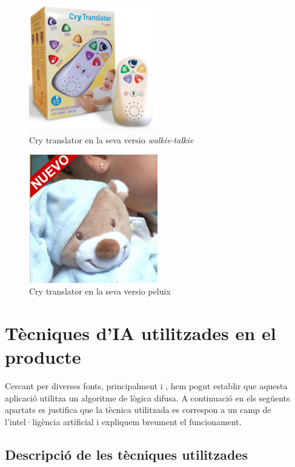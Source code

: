 \documentclass[11pt,a4paper]{article}
\begin{document}
\begin{figure}[hb]
\centering
\includegraphics[width=0.5\textwidth]{./fig/walkie.png}
\caption{Cry translator en la seva versio \emph{walkie-talkie}}
\label{fig:walkie}
\end{figure}

\begin{figure}[ht]
\centering
\includegraphics[width=0.5\textwidth]{./fig/peluix.png}
\caption{Cry translator en la seva versio peluix}
\label{fig:peluix}
\end{figure}

\section{\textsf{Tècniques d'IA utilitzades en el producte}}
\label{tecniques}

Cercant per diverses fonts, principalment \cite{patent} i \cite{elmundo}, hem pogut establir que aquesta aplicació utilitza un algoritme de lògica difusa. A continuació en els següents apartats es justifica que la tècnica utilitzada es correspon a un camp de l'intel·ligència artificial i expliquem breument el funcionament.

\subsection{\textsf{Descripció de les tècniques utilitzades}}
\label{descripcio}
\end{document}
